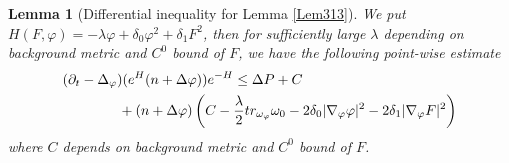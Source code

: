 \documentclass[11pt]{amsart}
\newtheorem{lem}{Lemma}[section]
\numberwithin{equation}{section}
\begin{document}
\begin{lem}[Differential inequality for Lemma \ref{Lem313}]\label{Lem314}
	We put $H(F,\varphi) = -\lambda \varphi + \delta_0\varphi^2 + \delta_1F^2$, then for sufficiently large $\lambda$ depending on background metric and $C^0$ bound of $F$, we have the following point-wise estimate 
	\begin{align}
	&(\partial_t - \Delta_{\varphi})(e^H(n+\Delta\varphi))e^{-H} \le    \Delta P + C \notag\\
	&\quad\quad\qquad + (n+\Delta\varphi)\left(C - \frac{\lambda}{2}tr_{\omega_{\varphi}}\omega_0 - 2\delta_0|\nabla_{\varphi}\varphi|^2 - 2\delta_1|\nabla_{\varphi}F|^2 \right)
\end{align}
where $C$ depends on background metric and $C^0$ bound of $F$. \\
\end{lem}
\end{document}
